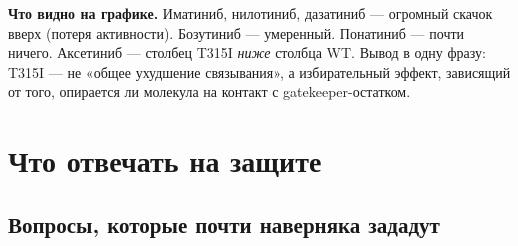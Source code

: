 \documentclass[11pt,a4paper]{article}
\begin{document}
\textbf{Что видно на графике.} Иматиниб, нилотиниб, дазатиниб --- огромный скачок
вверх (потеря активности). Бозутиниб --- умеренный. Понатиниб --- почти ничего.
Аксетиниб --- столбец T315I \emph{ниже} столбца WT. Вывод в одну фразу: T315I --- не
«общее ухудшение связывания», а избирательный эффект, зависящий от того, опирается
ли молекула на контакт с gatekeeper-остатком.

\section{Что отвечать на защите}

\subsection{Вопросы, которые почти наверняка зададут}
\end{document}
